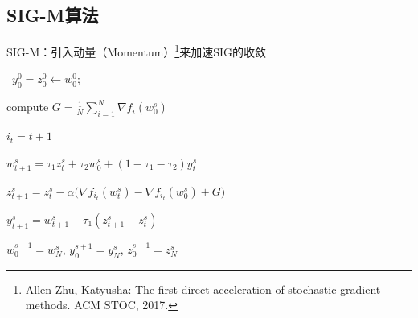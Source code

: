 \subsection{SIG-M算法}
\frame
{
SIG-M：引入动量（Momentum）\footnote{Allen-Zhu, Katyusha: The first direct acceleration of stochastic gradient methods. ACM STOC, 2017.}来加速SIG的收敛

\pause

{
\setlength{\interspacetitleruled}{-.4pt}%
\begin{algorithm}[H]
  \SetAlgoLined
   \
  $y_0^0 = z_0^0 \leftarrow w_0^0$; \

  {
   compute $G = \frac{1}{N} \sum_{i=1}^{N} \nabla f_i(w_0^s)$ \

   {
    $i_t = t+1$ \


    \alert<4>{$w_{t+1}^{s} = \tau_1 z_t^s + \tau_2 w_0^s + (1 - \tau_1 - \tau_2) y_t^s$} \

    \alert<3>{$z_{t+1}^s = z_t^s - \alpha \big(\nabla f_{i_t}(w_t^s) - \nabla f_{i_t}(w_0^s) + G \big)$} \

    \alert<3>{$y_{t+1}^s = w_{t+1}^s + \tau_1 (z_{t+1}^s - z_t^s)$} \

   }
   $w_0^{s+1} = w_N^s$, $y_0^{s+1} = y_N^s$, $z_0^{s+1} = z_N^s$ \

  }
\end{algorithm}
}

}



